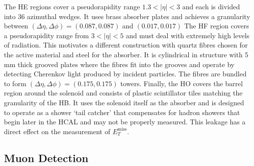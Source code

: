 The HE regions cover a pseudorapidity range $1.3<|\eta|<3$ and each is divided into 36 azimuthal wedges. It uses brass absorber plates and achieves a granularity between $(\Delta\eta,\Delta\phi) = (0.087,0.087)$ and $(0.017,0.017)$
The HF region covers a pseudorapidity range from $3<|\eta|<5$ and must deal with extremely high levels of radiation. This motivates a different construction with quartz fibres chosen for the active material and steel for the absorber. It is cylindrical in structure with 5\,mm thick grooved plates where the fibres fit into the grooves and operate by detecting Cherenkov light produced by incident particles. The fibres are bundled to form $(\Delta\eta,\Delta\phi) = (0.175,0.175)$ towers.
Finally, the HO covers the barrel region around the solenoid and consists of plastic scintillator tiles matching the granularity of the HB. It uses the solenoid itself as the absorber and is designed to operate as a shower `tail catcher' that compensates for hadron showers that begin later in the HCAL and may not be properly measured. This leakage has a direct effect on the measurement of $E_{T}^{\mathrm{miss}}$.



\subsection{Muon Detection}

